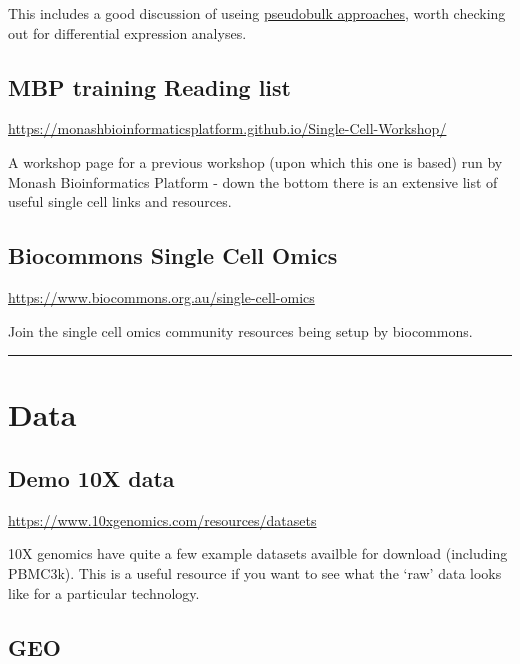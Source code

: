 \documentclass[
]{book}
\begin{document}
This includes a good discussion of useing \href{http://bioconductor.org/books/3.15/OSCA.multisample/multi-sample-comparisons.html\#creating-pseudo-bulk-samples}{pseudobulk approaches}, worth checking out for differential expression analyses.

\subsection*{MBP training Reading list}\label{mbp-training-reading-list}

\url{https://monashbioinformaticsplatform.github.io/Single-Cell-Workshop/}

A workshop page for a previous workshop (upon which this one is based) run by Monash Bioinformatics Platform - down the bottom there
is an extensive list of useful single cell links and resources.

\subsection*{Biocommons Single Cell Omics}\label{biocommons-single-cell-omics}

\url{https://www.biocommons.org.au/single-cell-omics}

Join the single cell omics community resources being setup by biocommons.

\begin{center}\rule{0.5\linewidth}{0.5pt}\end{center}

\section{Data}\label{data}

\subsection*{Demo 10X data}\label{demo-10x-data}

\url{https://www.10xgenomics.com/resources/datasets}

10X genomics have quite a few example datasets availble for download (including PBMC3k).
This is a useful resource if you want to see what the `raw' data looks like for a particular technology.

\subsection*{GEO}\label{geo}
\end{document}
